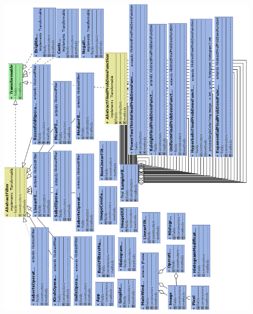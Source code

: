 \documentclass{classrep}
\begin{document}
\includegraphics[scale=0.6]{img/uml_diagram.png}
\end{document}
